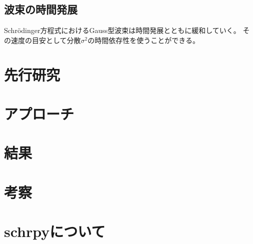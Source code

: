 \documentclass[autodetect-engine,dvipdfmx-if-dvi,ja=standard,a4j,layout=v2,10pt]{bxjsreport}
\begin{document}
    \section{波束の時間発展}
    Schrödinger方程式におけるGauss型波束は時間発展とともに緩和していく。
    その速度の目安として分散$\sigma^2$の時間依存性を使うことができる。
    \chapter{先行研究}
    \chapter{アプローチ}
    \chapter{結果}
    \chapter{考察}
    \chapter{schrpyについて}
\end{document}
